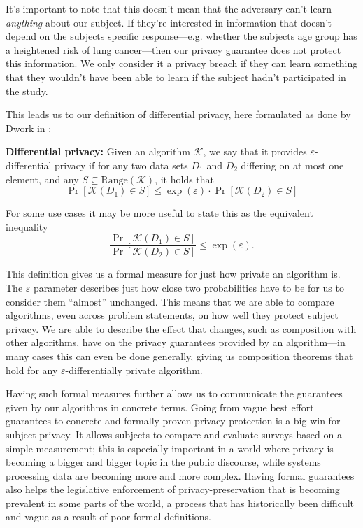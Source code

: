 \documentclass[12pt]{article}
\newcommand{\fancy}{\mathcal}
\renewcommand{\epsilon}{\varepsilon}
\begin{document}
It's important to note that this doesn't mean that the adversary can't learn \emph{anything} about our subject. If they're interested in information that doesn't depend on the subjects specific response---e.g. whether the subjects age group has a heightened risk of lung cancer---then our privacy guarantee does not protect this information. We only consider it a privacy breach if they can learn something that they wouldn't have been able to learn if the subject hadn't participated in the study. \bigskip


This leads us to our definition of differential privacy, here formulated as done by Dwork in \cite{dwork2006_diffpriv}:

\begin{mdframed}
    \textbf{Differential privacy:} Given an algorithm $\fancy{K}$, we say that it provides $\epsilon$-differential privacy if for any two data sets $D_1$ and $D_2$ differing on at most one element, and any $S \subseteq \text{Range}(\fancy{K})$, it holds that
    \begin{equation}\label{eq:diffpriv}
        \Pr[\fancy{K}(D_1) \in S] \leq \exp(\epsilon) \cdot \Pr[\fancy{K}(D_2) \in S]
    \end{equation}
\end{mdframed}

For some use cases it may be more useful to state this as the equivalent inequality
\begin{equation*}
    \frac{\Pr[\fancy{K}(D_1) \in S]}{\Pr[\fancy{K}(D_2) \in S]} \leq \exp(\epsilon).
\end{equation*}\bigskip

This definition gives us a formal measure for just how private an algorithm is. The $\epsilon$ parameter describes just how close two probabilities have to be for us to consider them ``almost'' unchanged. This means that we are able to compare algorithms, even across problem statements, on how well they protect subject privacy. We are able to describe the effect that changes, such as composition with other algorithms, have on the privacy guarantees provided by an algorithm---in many cases this can even be done generally, giving us composition theorems that hold for any $\epsilon$-differentially private algorithm.

Having such formal measures further allows us to communicate the guarantees given by our algorithms in concrete terms. Going from vague best effort guarantees to concrete and formally proven privacy protection is a big win for subject privacy. It allows subjects to compare and evaluate surveys based on a simple measurement; this is especially important in a world where privacy is becoming a bigger and bigger topic in the public discourse, while systems processing data are becoming more and more complex. Having formal guarantees also helps the legislative enforcement of privacy-preservation that is becoming prevalent in some parts of the world, a process that has historically been difficult and vague as a result of poor formal definitions. \bigskip
\end{document}
